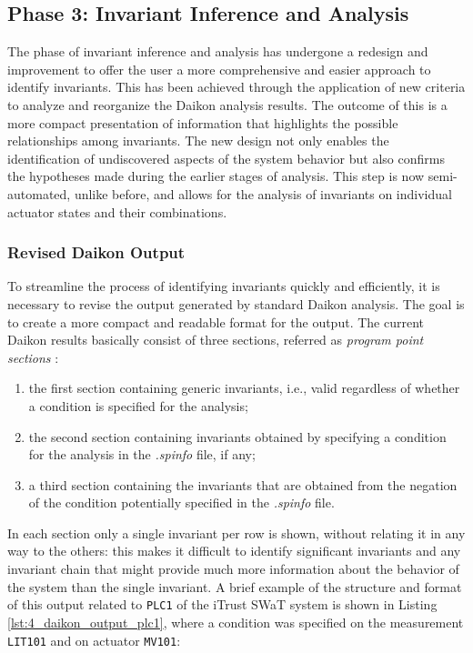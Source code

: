 \subsection{Phase 3: Invariant Inference and Analysis}
\label{subsec:4_improve_invariants}
The phase of invariant inference and analysis has undergone a redesign and improvement to offer the user a more comprehensive and easier approach to identify invariants. This has been achieved through the application of new criteria to analyze and reorganize the Daikon analysis results. The outcome of this is a more compact presentation of information that highlights the possible relationships among invariants.\newline
The new design not only enables the identification of undiscovered aspects of the system behavior but also confirms the hypotheses made during the earlier stages of analysis. This step is now semi-automated, unlike before, and allows for the analysis of invariants on individual actuator states and their combinations.

\subsubsection{Revised Daikon Output}
\label{subsub:4_new_daikon_output}
To streamline the process of identifying invariants quickly and efficiently, it is necessary to revise the output generated by standard Daikon analysis. The goal is to create a more compact and readable format for the output.
\newline \newline
The current Daikon results basically consist of three sections, referred as \textit{program point sections} \cite{daikon_program_point}:

\begin{enumerate}
	\item the first section containing generic invariants, i.e., valid regardless of whether a condition is specified for the analysis;
	
	\item the second section containing invariants obtained by specifying a condition for the analysis in the \textit{.spinfo} file, if any;
	
	\item a third section containing the invariants that are obtained from the negation of the condition potentially specified in the \textit{.spinfo} file.
\end{enumerate}

In each section only a single invariant per row is shown, without relating it in any way to the others: this makes it difficult to identify significant invariants and any invariant chain that might provide much more information about the behavior of the system than the single invariant.\newline
A brief example of the structure and format of this output related to \texttt{PLC1} of the iTrust SWaT system is shown in Listing \ref{lst:4_daikon_output_plc1}, where a condition was specified on the measurement \texttt{LIT101} and on actuator \texttt{MV101}: %

